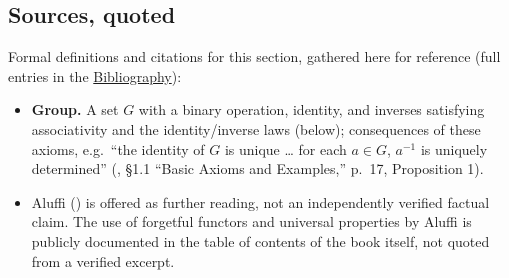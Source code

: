 \subsection{Sources, quoted}\label{sec:07-groups:01-definition:2}

Formal definitions and citations for this section, gathered here for reference (full entries in the \hyperref[sec:root:bibliography:1]{Bibliography}):

\begin{itemize}
\tightlist
\item
  \textbf{Group.} A set \(G\) with a binary operation, identity, and inverses satisfying associativity and the identity/inverse laws (below); consequences of these axioms, e.g.~``the identity of \(G\) is unique \ldots{} for each \(a \in G\), \(a^{-1}\) is uniquely determined'' (\cite{DummitFoote2003}, §1.1 ``Basic Axioms and Examples,'' p.~17, Proposition 1).
\item
  Aluffi (\cite{Aluffi2009}) is offered as further reading, not an independently verified factual claim. The use of forgetful functors and universal properties by Aluffi is publicly documented in the table of contents of the book itself, not quoted from a verified excerpt.
\end{itemize}
